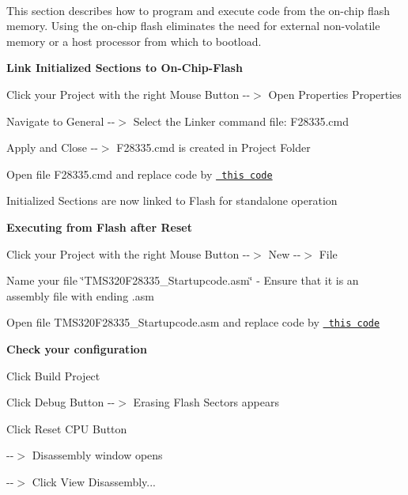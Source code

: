 ~\newline


This section describes how to program and execute code from the on-\/chip flash memory. Using the on-\/chip flash eliminates the need for external non-\/volatile memory or a host processor from which to bootload.



{\bfseries{Link Initialized Sections to On-\/\+Chip-\/\+Flash}}


\begin{DoxyEnumerate}
\item Click your Project with the right Mouse Button -\/-\/$>$ Open Properties Properties
\item Navigate to General -\/-\/$>$ Select the Linker command file\+: F28335.\+cmd



Apply and Close -\/-\/$>$ F28335.\+cmd is created in Project Folder
\item Open file F28335.\+cmd and replace code by \href{../doc_documents/F28335.cmd}{\texttt{ this~code}} ~\newline

\end{DoxyEnumerate}

Initialized Sections are now linked to Flash for standalone operation



{\bfseries{Executing from Flash after Reset}}


\begin{DoxyEnumerate}
\item Click your Project with the right Mouse Button -\/-\/$>$ New -\/-\/$>$ File
\item Name your file \char`\"{}\+T\+M\+S320\+F28335\+\_\+\+Startupcode.\+asm\char`\"{} -\/ Ensure that it is an assembly file with ending .asm


\item Open file T\+M\+S320\+F28335\+\_\+\+Startupcode.\+asm and replace code by \href{../doc_documents/TMS320F28335_Startupcode.asm}{\texttt{ this code}} ~\newline

\end{DoxyEnumerate}



{\bfseries{Check your configuration}}


\begin{DoxyEnumerate}
\item Click Build Project
\item Click Debug Button -\/-\/$>$ Erasing Flash Sectors appears


\item Click Reset C\+PU Button 

-\/-\/$>$ Disassembly window opens

-\/-\/$>$ Click View Disassembly... 
\end{DoxyEnumerate}

